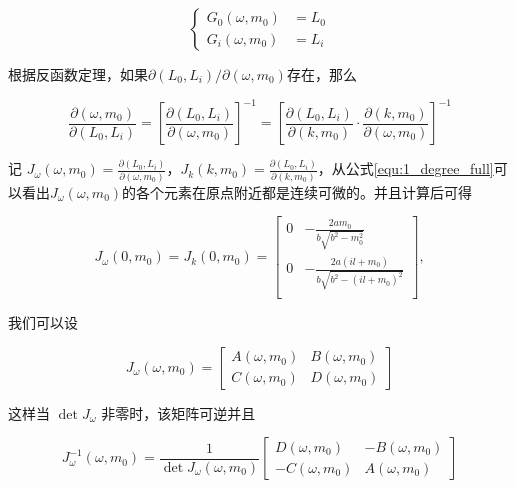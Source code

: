 \begin{equation}
	\left\{
		\begin{aligned}
			G_0(\omega, m_0) &= L_0 \\
			G_i(\omega, m_0) &= L_i
		\end{aligned}
	\right.
	\label{equ:5_length_eq2}
\end{equation}

根据反函数定理，如果$\partial (L_0, L_i) / \partial (\omega, m_0)$存在，那么

\begin{equation}
	\frac{\partial(\omega, m_0)}{\partial(L_0, L_i)}
	= \left[\frac{\partial(L_0, L_i)}{\partial(\omega, m_0)}\right]^{-1}
	= \left[\frac{\partial(L_0, L_i)}{\partial(k, m_0)}\cdot \frac{\partial(k, m_0)}{\partial(\omega, m_0)}\right]^{-1}
	\label{equ:5_inv_partial}
\end{equation}

记 $\displaystyle J_\omega(\omega, m_0) = \frac{\partial(L_0, L_i)}{\partial(\omega, m_0)}$，$\displaystyle J_k(k, m_0) = \frac{\partial(L_0, L_i)}{\partial(k, m_0)}$，从公式\ref{equ:1_degree_full}可以看出$J_\omega(\omega, m_0)$的各个元素在原点附近都是连续可微的。并且计算后可得

\begin{equation}
	J_\omega(0, m_0) = J_k(0, m_0) = \begin{bmatrix}
		0 & -\frac{2 a m_0}{b \sqrt{b^2 - m_0^2}} \\
		0 & -\frac{2 a (i l+m_0)}{b \sqrt{b^2 - (i l+m_0)^2}} \\
	\end{bmatrix},
	\label{equ:5_jacob_k0}
\end{equation}

我们可以设

\begin{equation}
	J_\omega(\omega, m_0) = \begin{bmatrix}
		A(\omega, m_0) & B(\omega, m_0) \\
		C(\omega, m_0) & D(\omega, m_0)
	\end{bmatrix}
	\label{equ:5_j_omega}
\end{equation}

这样当 $\det J_\omega$ 非零时，该矩阵可逆并且

\begin{equation}
	J_\omega^{-1}(\omega, m_0) = \frac{1}{\det J_\omega(\omega, m_0)}
	\begin{bmatrix}
		D(\omega, m_0) & -B(\omega, m_0) \\
		-C(\omega, m_0) & A(\omega, m_0)
	\end{bmatrix}
	\label{equ:5_j_omega_inv}
\end{equation}

